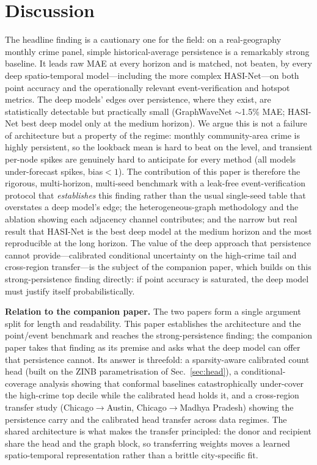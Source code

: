 \documentclass[11pt,conference]{IEEEtran}
\begin{document}
\section{Discussion}\label{sec:disc}
The headline finding is a cautionary one for the field: on a real-geography
monthly crime panel, simple historical-average persistence is a remarkably
strong baseline. It leads raw MAE at every horizon and is matched, not beaten,
by every deep spatio-temporal model---including the more complex HASI-Net---on
both point accuracy and the operationally relevant event-verification and
hotspot metrics. The deep models' edges over persistence, where they exist,
are statistically detectable but practically small (GraphWaveNet $\sim$1.5\%
MAE; HASI-Net best deep model only at the medium horizon). We argue this is
not a failure of architecture but a property of the regime: monthly
community-area crime is highly persistent, so the lookback mean is hard to
beat on the level, and transient per-node spikes are genuinely hard to
anticipate for every method (all models under-forecast spikes, bias${<}1$).
The contribution of this paper is therefore the rigorous, multi-horizon,
multi-seed benchmark with a leak-free event-verification protocol that
\emph{establishes} this finding rather than the usual single-seed table that
overstates a deep model's edge; the heterogeneous-graph methodology and the
ablation showing each adjacency channel contributes; and the narrow but real
result that HASI-Net is the best deep model at the medium horizon and the most
reproducible at the long horizon. The value of the deep approach that
persistence cannot provide---calibrated conditional uncertainty on the
high-crime tail and cross-region transfer---is the subject of the companion
paper, which builds on this strong-persistence finding directly: if point
accuracy is saturated, the deep model must justify itself probabilistically.

\textbf{Relation to the companion paper.} The two papers form a single
argument split for length and readability. This paper establishes the
architecture and the point/event benchmark and reaches the strong-persistence
finding; the companion paper takes that finding as its premise and asks what
the deep model can offer that persistence cannot. Its answer is threefold: a
sparsity-aware calibrated count head (built on the ZINB parametrisation of
Sec.~\ref{sec:head}), a conditional-coverage analysis showing that conformal
baselines catastrophically under-cover the high-crime top decile while the
calibrated head holds it, and a cross-region transfer study
(Chicago$\to$Austin, Chicago$\to$Madhya Pradesh) showing the persistence
carry and the calibrated head transfer across data regimes. The shared
architecture is what makes the transfer principled: the donor and recipient
share the head and the graph block, so transferring weights moves a learned
spatio-temporal representation rather than a brittle city-specific fit.
\end{document}
